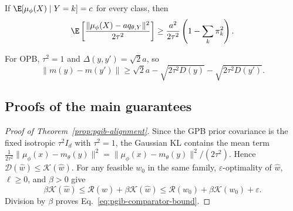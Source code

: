\begin{proposition}
\label{prop:opb-collapse}
If $\E[\mu_\phi(X)\mid Y=k]=c$ for every class, then
\begin{equation}
\E\left[\frac{\|\mu_\phi(X)-a q_{\theta,Y}\|^2}{2\tau^2}\right]
\ge\frac{a^2}{2\tau^2}\left(1-\sum_k\pi_k^2\right).
\label{eq:opb-collapse}
\end{equation}
\end{proposition}

\begin{corollary}
\label{prop:opb-separation}
For OPB, $\tau^2=1$ and $\Delta(y,y')=\sqrt2a$, so
\begin{equation}
\|m(y)-m(y')\|\ge\sqrt2a-\sqrt{2\tau^2D(y)}-\sqrt{2\tau^2D(y')}.
\label{eq:opb-separation}
\end{equation}
\end{corollary}
\subsection{Proofs of the main guarantees}

\begin{proof}[Proof of Theorem~\ref{prop:pgib-alignment}]
Since the GPB prior covariance is the fixed isotropic $\tau^2I_d$ with
$\tau^2=1$, the Gaussian KL contains the mean term
$\frac1{2\tau^2}\|\mu_\phi(x)-m_\theta(y)\|^2
=\|\mu_\phi(x)-m_\theta(y)\|^2/(2\tau^2)$. Hence
$\mathcal D(\widehat w)\le\mathcal K(\widehat w)$. For any feasible $w_0$ in the
same family, $\varepsilon$-optimality of $\widehat w$, $\ell\ge0$, and $\beta>0$
give
\begin{equation*}
\beta\mathcal K(\widehat w)
\le \mathcal R(\widehat w)+\beta\mathcal K(\widehat w)
\le \mathcal R(w_0)+\beta\mathcal K(w_0)+\varepsilon.
\end{equation*}
Division by $\beta$ proves Eq.~\eqref{eq:pgib-comparator-bound}.
\end{proof}

